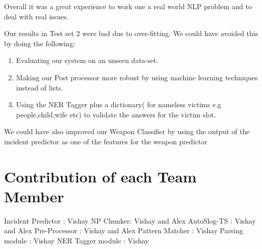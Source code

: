 \documentclass[11pt]{myclass}
\begin{document}
Overall it was a great experience to work one a real world NLP problem and to deal with real issues.

Our results in Test set 2 were bad due to over-fitting. We could have avoided this by doing the following:

\begin{enumerate}

\item Evaluating our system on an unseen data-set. 
\item Making our Post processor more robust by using machine learning techniques instead of lists.
\item Using the NER Tagger plus a dictionary( for nameless victims e.g people,child,wife etc) to validate the answers for the victim slot. 

\end{enumerate}

We could have also improved our Weapon Classifier by using the output of the incident predictor as one of the features for the weapon predictor

\section{Contribution of each Team Member}

Incident Predictor : Vishay
NP Chunker: Vishay and Alex  
AutoSlog-TS : Vishay and Alex
Pre-Processor : Vishay and Alex 
Pattern Matcher : Vishay
Parsing module : Vishay
NER Tagger module : Vishay 
\end{document}
